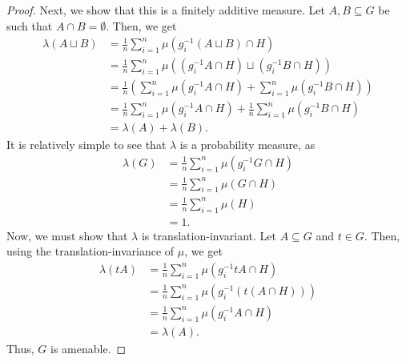 \begin{proof}
  Next, we show that this is a finitely additive measure. Let $A,B\subseteq G$ be such that $A\cap B = \emptyset$. Then, we get
  \begin{align*}
    \lambda\left(A\sqcup B\right) &= \frac{1}{n}\sum_{i=1}^{n}\mu\left(g_i^{-1}\left(A\sqcup B\right)\cap H\right)\\
                                  &= \frac{1}{n}\sum_{i=1}^{n}\mu\left(\left(g_i^{-1}A\cap H\right)\sqcup \left(g_i^{-1}B\cap H\right)\right)\\
                                  &= \frac{1}{n}\left(\sum_{i=1}^{n}\mu\left(g_i^{-1}A\cap H\right) + \sum_{i=1}^{n}\mu\left(g_i^{-1}B\cap H\right)\right)\\
                                  &= \frac{1}{n}\sum_{i=1}^{n}\mu\left(g_i^{-1}A\cap H\right) + \frac{1}{n}\sum_{i=1}^{n}\mu\left(g_i^{-1}B\cap H\right)\\
                                  &= \lambda\left(A\right) + \lambda\left(B\right).
  \end{align*}
  It is relatively simple to see that $\lambda$ is a probability measure, as
  \begin{align*}
    \lambda\left(G\right) &= \frac{1}{n}\sum_{i=1}^{n}\mu\left(g_i^{-1}G\cap H\right)\\
                          &= \frac{1}{n}\sum_{i=1}^{n}\mu\left(G\cap H\right)\\
                          &= \frac{1}{n}\sum_{i=1}^{n}\mu\left(H\right)\\
                          &= 1.
  \end{align*}
  Now, we must show that $\lambda$ is translation-invariant. Let $A\subseteq G$ and $t\in G$. Then, using the translation-invariance of $\mu$, we get
  \begin{align*}
    \lambda\left(tA\right) &= \frac{1}{n}\sum_{i=1}^{n}\mu\left(g_i^{-1}tA\cap H\right)\\
                           &= \frac{1}{n}\sum_{i=1}^{n}\mu\left(g_i^{-1}\left(t\left(A\cap H\right)\right)\right)\\
                           &= \frac{1}{n}\sum_{i=1}^{n}\mu\left(g_i^{-1}A\cap H\right)\\
                           &= \lambda\left(A\right).
  \end{align*}
  Thus, $G$ is amenable.
\end{proof}
